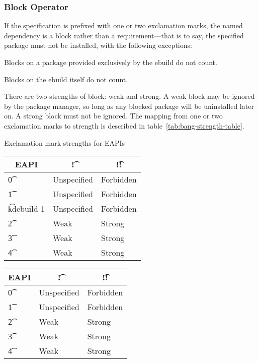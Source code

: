 \subsubsection{Block Operator}

If the specification is prefixed with one or two exclamation marks, the named dependency is a block
rather than a requirement---that is to say, the specified package must not be installed, with the
following exceptions:

\begin{compactitem}
\item Blocks on a package provided exclusively by the ebuild do not count. \label{provided-blocks}
\item Blocks on the ebuild itself do not count.
\end{compactitem}

 There are two strengths of block: weak and strong. A weak block may be
ignored by the package manager, so long as any blocked package will be uninstalled later on. A
strong block must not be ignored. The mapping from one or two exclamation marks to strength is
described in table~\ref{tab:bang-strength-table}.

\begin{centertable}{Exclamation mark strengths for EAPIs} \label{tab:bang-strength-table}
\IFKDEBUILDELSE
{
    \begin{tabular}{ l l l }
        \toprule
            \multicolumn{1}{c}{\textbf{EAPI}} &
            \multicolumn{1}{c}{\textbf{\t{!}}} &
            \multicolumn{1}{c}{\textbf{\t{!!}}} \\
            \midrule
    \t{0} & Unspecified & Forbidden \\
    \t{1} & Unspecified & Forbidden \\
    \t{kdebuild-1} & Unspecified & Forbidden \\
    \t{2} & Weak & Strong \\
    \t{3} & Weak & Strong \\
    \t{4} & Weak & Strong \\
    \bottomrule
    \end{tabular}
}{
    \begin{tabular}{ l l l }
        \toprule
            \multicolumn{1}{c}{\textbf{EAPI}} &
            \multicolumn{1}{c}{\textbf{\t{!}}} &
            \multicolumn{1}{c}{\textbf{\t{!!}}} \\
            \midrule
    \t{0} & Unspecified & Forbidden \\
    \t{1} & Unspecified & Forbidden \\
    \t{2} & Weak & Strong \\
    \t{3} & Weak & Strong \\
    \t{4} & Weak & Strong \\
    \bottomrule
    \end{tabular}
}
\end{centertable}

